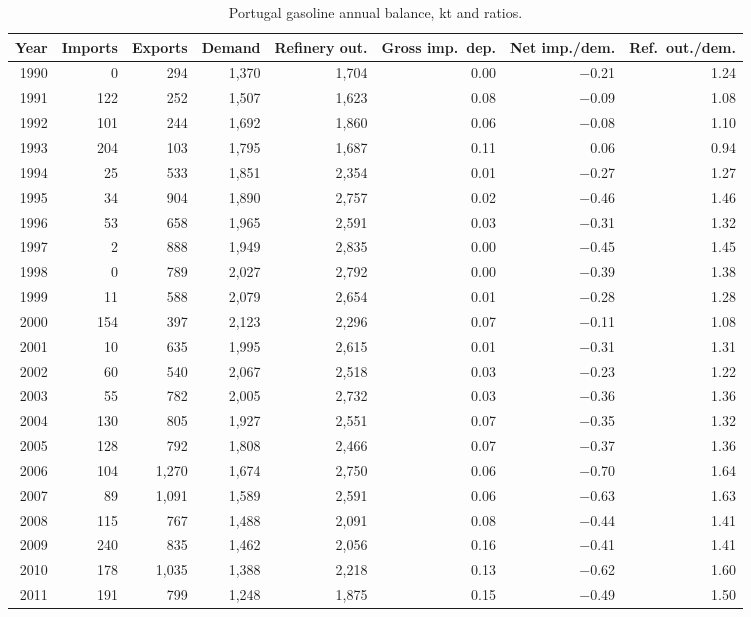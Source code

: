 \documentclass[11pt,a4paper]{article}
\begin{document}
\begin{table}[htbp]
\centering
\caption{Portugal gasoline annual balance, kt and ratios.}
\label{tab:gasoline}
\small
\begin{tabular}{rrrrrrrr}
\toprule
Year & Imports & Exports & Demand & Refinery out. & Gross imp.\ dep. & Net imp./dem. & Ref.\ out./dem. \\
\midrule
1990 & 0 & 294 & 1{,}370 & 1{,}704 & 0.00 & $-$0.21 & 1.24 \\
1991 & 122 & 252 & 1{,}507 & 1{,}623 & 0.08 & $-$0.09 & 1.08 \\
1992 & 101 & 244 & 1{,}692 & 1{,}860 & 0.06 & $-$0.08 & 1.10 \\
1993 & 204 & 103 & 1{,}795 & 1{,}687 & 0.11 & 0.06 & 0.94 \\
1994 & 25 & 533 & 1{,}851 & 2{,}354 & 0.01 & $-$0.27 & 1.27 \\
1995 & 34 & 904 & 1{,}890 & 2{,}757 & 0.02 & $-$0.46 & 1.46 \\
1996 & 53 & 658 & 1{,}965 & 2{,}591 & 0.03 & $-$0.31 & 1.32 \\
1997 & 2 & 888 & 1{,}949 & 2{,}835 & 0.00 & $-$0.45 & 1.45 \\
1998 & 0 & 789 & 2{,}027 & 2{,}792 & 0.00 & $-$0.39 & 1.38 \\
1999 & 11 & 588 & 2{,}079 & 2{,}654 & 0.01 & $-$0.28 & 1.28 \\
2000 & 154 & 397 & 2{,}123 & 2{,}296 & 0.07 & $-$0.11 & 1.08 \\
2001 & 10 & 635 & 1{,}995 & 2{,}615 & 0.01 & $-$0.31 & 1.31 \\
2002 & 60 & 540 & 2{,}067 & 2{,}518 & 0.03 & $-$0.23 & 1.22 \\
2003 & 55 & 782 & 2{,}005 & 2{,}732 & 0.03 & $-$0.36 & 1.36 \\
2004 & 130 & 805 & 1{,}927 & 2{,}551 & 0.07 & $-$0.35 & 1.32 \\
2005 & 128 & 792 & 1{,}808 & 2{,}466 & 0.07 & $-$0.37 & 1.36 \\
2006 & 104 & 1{,}270 & 1{,}674 & 2{,}750 & 0.06 & $-$0.70 & 1.64 \\
2007 & 89 & 1{,}091 & 1{,}589 & 2{,}591 & 0.06 & $-$0.63 & 1.63 \\
2008 & 115 & 767 & 1{,}488 & 2{,}091 & 0.08 & $-$0.44 & 1.41 \\
2009 & 240 & 835 & 1{,}462 & 2{,}056 & 0.16 & $-$0.41 & 1.41 \\
2010 & 178 & 1{,}035 & 1{,}388 & 2{,}218 & 0.13 & $-$0.62 & 1.60 \\
2011 & 191 & 799 & 1{,}248 & 1{,}875 & 0.15 & $-$0.49 & 1.50 \\

\end{tabular}
\end{table}
\end{document}
